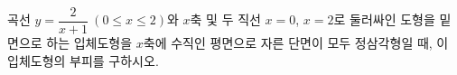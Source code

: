 곡선 $y=\dfrac{2}{x+1}\ (0\le x\le 2)$와 $x$축 및 두 직선 $x=0$, $x=2$로 둘러싸인 도형을 밑면으로 하는 입체도형을 $x$축에 수직인 평면으로 자른 단면이 모두 정삼각형일 때, 이 입체도형의 부피를 구하시오.
